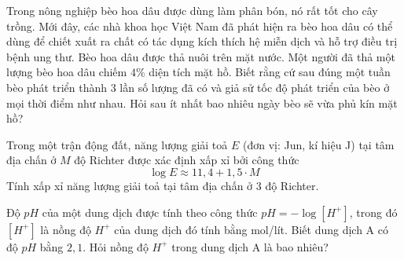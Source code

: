 \begin{ex}%
	Trong nông nghiệp bèo hoa dâu được dùng làm phân bón, nó rất tốt cho cây trồng. Mới đây, các nhà khoa học Việt Nam đã phát hiện ra bèo hoa dâu có thể  dùng để chiết xuất ra chất có tác dụng kích thích hệ miễn dịch và hỗ trợ điều trị bệnh ung thư. Bèo hoa dâu được thả nuôi trên mặt nước. Một người đã thả một lượng bèo hoa dâu chiếm $4\%$ diện tích mặt hồ. Biết rằng cứ sau đúng một tuần bèo phát triển thành 3 lần số lượng đã có và giả sử tốc độ phát triển của bèo ở mọi thời điểm như nhau. Hỏi sau ít nhất bao nhiêu ngày bèo sẽ vừa phủ kín mặt hồ?
\end{ex}

\begin{ex}%
	Trong một trận động đất, năng lượng giải toả $E$ (đơn vị: Jun, kí hiệu J) tại tâm địa chấn ở $M$ độ Richter được xác định xấp xỉ bởi công thức 
	 $$
	\log  E \approx 11{,}4 + 1{,}5 \cdot M
	 $$
	Tính xấp xỉ năng lượng giải toả tại tâm địa chấn ở $3$ độ Richter. 
\end{ex}

\begin{ex}%
	Độ $pH$ của một dung dịch được tính theo công thức $pH=-\log\left[H^+ \right]$, trong đó $\left[H^+ \right]$ là nồng độ $H^+$ của dung dịch đó tính bằng mol/lít. Biết dung dịch A có độ $pH$ bằng  $2{,}1$. Hỏi nồng độ $H^+$ trong dung dịch A là bao nhiêu?
\end{ex}

